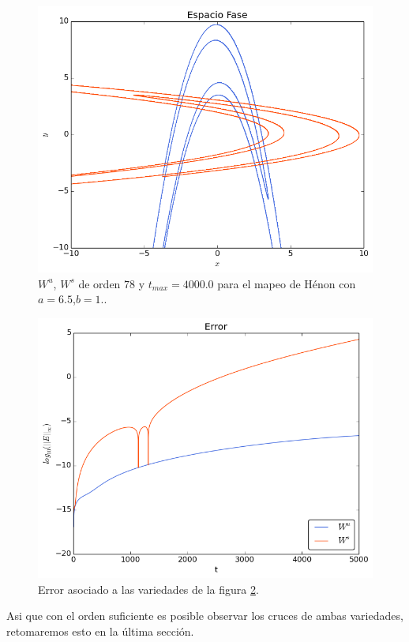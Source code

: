 \begin{figure}[H]
\centering
\includegraphics[scale=0.6]{henon3}
\caption{$W^{u}$, $W^{s}$ de orden $78$ y $t_{max}=4000.0$ para el mapeo de Hénon con $a=6.5$,$b=1.$.}
\label{Henon3}
\end{figure}

\begin{figure}[H]
\centering
\includegraphics[scale=0.6]{ErrorHenon3}
\caption{Error asociado a las variedades de la figura \ref{Henon3}.}
\label{Henon3}
\end{figure}


Asi que con el orden suficiente es posible observar los cruces de ambas variedades, retomaremos esto en la última sección. 

